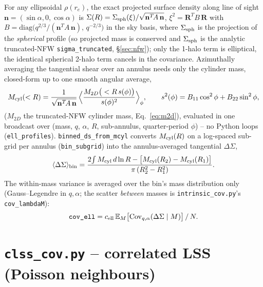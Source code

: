 \documentclass[a4paper, 11pt]{article}
\newcommand{\pyfile}[1]{{\small\texttt{#1}}}
\begin{document}
For any ellipsoidal $\rho(r_e)$, the exact projected surface density
along line of sight $\mathbf n=(\sin\alpha,0,\cos\alpha)$ is
$\Sigma(R)=\Sigma_{\rm sph}(\xi)/\sqrt{\mathbf n^T\!A\,\mathbf n}$,
$\xi^2=\mathbf R^T B\,\mathbf R$ with $B=\mathrm{diag}\big(q^{2/3}/
(\mathbf n^T\!A\,\mathbf n),\,q^{-2/3}\big)$ in the sky basis, where
$\Sigma_{\rm sph}$ is the projection of the \emph{spherical} profile
(so projected mass is conserved and $\Sigma_{\rm sph}$ is the analytic
truncated-NFW \texttt{sigma\_truncated}, \S\ref{sec:nfw}); only the
1-halo term is elliptical, the identical spherical 2-halo term cancels
in the covariance. Azimuthally averaging the tangential shear over an
annulus needs only the cylinder mass, closed-form up to one smooth
angular average,
\begin{equation}
  M_{\rm cyl}(<R) = \frac{1}{\sqrt{\mathbf n^T\!A\,\mathbf n}}\,
    \Big\langle \frac{M_{2D}\big(<R\,s(\phi)\big)}{s(\phi)^2}
    \Big\rangle_\phi, \qquad
  s^2(\phi) = B_{11}\cos^2\phi + B_{22}\sin^2\phi,
\end{equation}
($M_{2D}$ the truncated-NFW cylinder mass, Eq.~\ref{eq:m2d}), evaluated
in one broadcast over (mass, $q$, $\alpha$, $R$, sub-annulus,
quarter-period $\phi$) -- no Python loops (\texttt{ell\_profiles}).
\texttt{binned\_ds\_from\_mcyl} converts $M_{\rm cyl}(R)$ on a
log-spaced sub-grid per annulus (\texttt{bin\_subgrid}) into the
annulus-averaged tangential $\Delta\Sigma$,
\begin{equation}
  \langle\Delta\Sigma\rangle_{\rm bin} =
    \frac{2\!\int M_{\rm cyl}\,d\ln R - \big[M_{\rm cyl}(R_2)-M_{\rm cyl}(R_1)\big]}
         {\pi\left(R_2^2-R_1^2\right)}.
\end{equation}
The within-mass variance is averaged over the bin's mass distribution
only (Gauss--Legendre in $q,\alpha$; the scatter \emph{between} masses
is \texttt{intrinsic\_cov.py}'s \texttt{cov\_lambdaM}):
\begin{equation}
  \texttt{cov\_ell} = c_{\rm ell}\,
    \mathbb{E}_M\big[\mathrm{Cov}_{q,\alpha}(\Delta\Sigma\mid M)\big]\,/\,N.
\end{equation}

\section{\pyfile{clss\_cov.py} -- correlated LSS (Poisson neighbours)}
\label{sec:clss}
\end{document}
